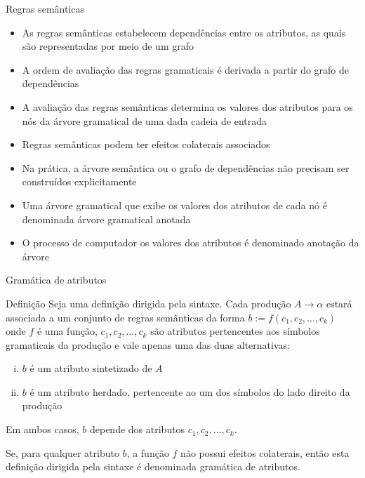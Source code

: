 \begin{frame}[fragile]{Regras semânticas}

    \begin{itemize}
        \item As regras semânticas estabelecem dependências entre os atributos, as quais são representadas por meio de um grafo

        \item A ordem de avaliação das regras gramaticais é derivada a partir do grafo de dependências

        \item A avaliação das regras semânticas determina os valores dos atributos para os nós da árvore gramatical de uma dada 
            cadeia de entrada

        \item Regras semânticas podem ter efeitos colaterais associados

        \item Na prática, a árvore semântica ou o grafo de dependências não precisam ser construídos explicitamente

        \item Uma árvore gramatical que exibe os valores dos atributos de cada nó é denominada árvore gramatical anotada

        \item O processo de computador os valores dos atributos é denominado anotação da árvore
    \end{itemize}

\end{frame}

\begin{frame}[fragile]{Gramática de atributos}

    \begin{block}{Definição}
        Seja uma definição dirigida pela sintaxe. Cada produção $A\to \alpha$ estará associada a um conjunto de regras semânticas da
        forma $b := f(c_1, c_2, \ldots, c_k)$ onde $f$ é uma função, $c_1, c_2, \ldots, c_k$ são atributos pertencentes aos símbolos
        gramaticais da produção e vale apenas uma das duas alternativas:
        \begin{enumerate}[(i)]
            \item $b$ é um atributo sintetizado de $A$
            \item $b$ é um atributo herdado, pertencente ao um dos símbolos do lado direito da produção
        \end{enumerate}
        Em ambos casos, $b$ depende dos atributos $c_1, c_2, \ldots, c_k$.

        \vspace{0.1in}
        Se, para qualquer atributo $b$, a função $f$ não possui efeitos colaterais, então esta definição dirigida pela sintaxe é 
        denominada gramática de atributos.
    \end{block}

\end{frame}


